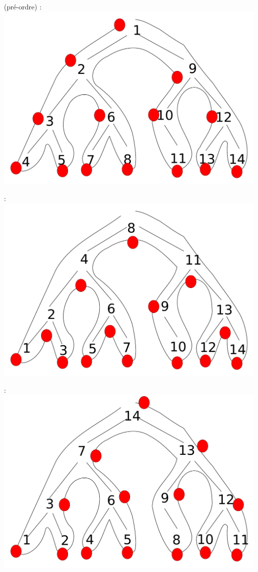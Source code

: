 \begin{center}

 (pré-ordre) :\\
\includegraphics[width=0.5\linewidth]{fig2_prefixe.pdf}

 :\\
\includegraphics[width=0.5\linewidth]{fig3_infixe.pdf}

 :\\
\includegraphics[width=0.5\linewidth]{fig4_suffixe.pdf}

\end{center}

